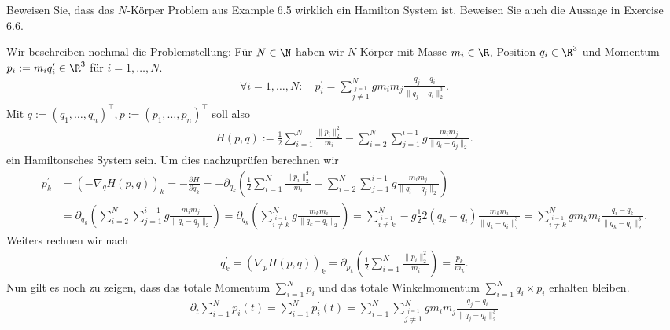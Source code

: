 \begin{exercise}
  Beweisen Sie, dass das $N$-Körper Problem aus Example 6.5
  wirklich ein Hamilton System ist. Beweisen Sie auch die
  Aussage in Exercise 6.6.
\end{exercise}

\begin{solution}
  Wir beschreiben nochmal die Problemstellung: Für $N \in \N$ haben wir $N$ Körper
  mit Masse $m_i \in \R$, Position $q_i \in \R^3$ und Momentum $p_i := m_iq_i^{\prime} \in \R^3$
  für $i = 1,\dots,N$.
  \begin{align*}
    \forall i = 1,\dots,N: \quad p_i^{\prime} = \sum_{\stackrel{j = 1}{j \neq 1}}^N gm_im_j \frac{q_j - q_i}{\|q_j - q_i\|_2^3}.
  \end{align*}
  Mit $q := (q_1,\dots,q_n)^{\top}, p := (p_1,\dots,p_n)^{\top}$ soll also
  \begin{align*}
    H(p,q) := \frac{1}{2}\sum_{i=1}^N \frac{\|p_i\|_2^2}{m_i}- \sum_{i = 2}^N\sum_{j=1}^{i-1}g\frac{m_im_j}{\|q_i-q_j\|_2}.
  \end{align*}
  ein Hamiltonsches System sein. Um dies nachzuprüfen berechnen wir
  \begin{align*}
    p_k^{\prime} &= \left(- \nabla_q H(p,q)\right)_k = - \frac{\partial H}{\partial q_k}
    = -\partial_{q_k}\left(\frac{1}{2}\sum_{i=1}^N \frac{\|p_i\|_2^2}{m_i}- \sum_{i = 2}^N\sum_{j=1}^{i-1}g\frac{m_im_j}{\|q_i-q_j\|_2}\right) \\
    &= \partial_{q_k}\left(\sum_{i = 2}^N\sum_{j=1}^{i-1}g\frac{m_im_j}{\|q_i-q_j\|_2}\right)
    = \partial_{q_k}\left(\sum_{\stackrel{i = 1}{i \neq k}}^{N}g\frac{m_km_i}{\|q_k-q_i\|_2}\right)
    = \sum_{\stackrel{i = 1}{i \neq k}}^{N}-g\frac{1}{2}2(q_k - q_i)\frac{m_km_i}{\|q_k-q_i\|_2^3}
    = \sum_{\stackrel{i = 1}{i \neq k}}^{N}gm_km_i\frac{q_i - q_k}{\|q_k-q_i\|_2^3}.
  \end{align*}
  Weiters rechnen wir nach
  \begin{align*}
    q_k^{\prime} = \left(\nabla_p H(p,q)\right)_k = \partial_{p_k}\left(\frac{1}{2}\sum_{i=1}^N \frac{\|p_i\|_2^2}{m_i}\right)
    = \frac{p_k}{m_k}.
  \end{align*}
  Nun gilt es noch zu zeigen, dass das totale Momentum $\sum_{i=1}^N p_i$
  und das totale Winkelmomentum $\sum_{i=1}^N q_i \times p_i$ erhalten bleiben.
  \begin{align*}
    \partial_t \sum_{i=1}^N p_i(t) = \sum_{i=1}^N p_i^{\prime}(t)
    = \sum_{i=1}^N \sum_{\stackrel{j = 1}{j \neq 1}}^N gm_im_j \frac{q_j - q_i}{\|q_j - q_i\|_2^3}

\end{align*}
\end{solution}
